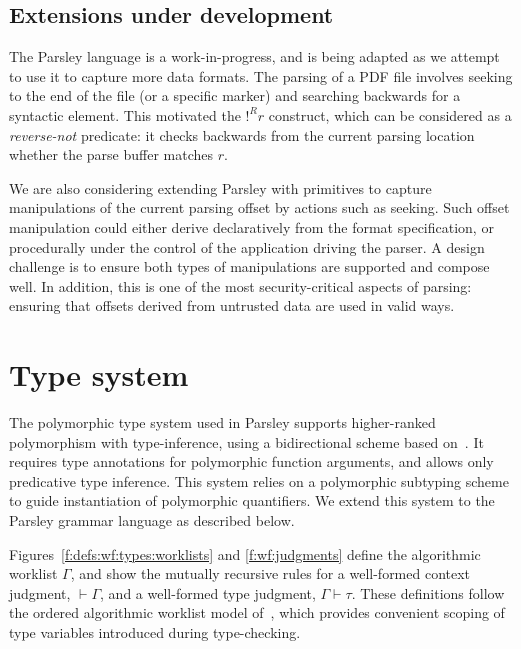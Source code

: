 \documentclass[letterpaper]{article}
\begin{document}
\subsection*{Extensions under development}

The Parsley language is a work-in-progress, and is being adapted as we
attempt to use it to capture more data formats.  The parsing of a PDF
file involves seeking to the end of the file (or a specific marker)
and searching backwards for a syntactic element.  This motivated the
$!^Rr$ construct, which can be considered as a \emph{reverse-not}
predicate: it checks backwards from the current parsing location
whether the parse buffer matches $r$.

We are also considering extending Parsley with primitives to capture
manipulations of the current parsing offset by actions such as
seeking.  Such offset manipulation could either derive declaratively
from the format specification, or procedurally under the control of
the application driving the parser.  A design challenge is to ensure
both types of manipulations are supported and compose well.  In
addition, this is one of the most security-critical aspects of
parsing: ensuring that offsets derived from untrusted data are used in
valid ways.

\section{Type system}
\label{s:typesys}

The polymorphic type system used in Parsley supports higher-ranked
polymorphism with type-inference, using a bidirectional scheme based
on~\cite{Dunfield13:bidir}.  It requires type annotations for
polymorphic function arguments, and allows only predicative type
inference.  This system relies on a polymorphic subtyping scheme
\cite{odersky96} to guide instantiation of polymorphic quantifiers.
We extend this system to the Parsley grammar language as described
below.

Figures~\ref{f:defs:wf:types:worklists} and \ref{f:wf:judgments} define the algorithmic
worklist $\Gamma$, and show the mutually recursive rules for a
well-formed context judgment, $\vdash\Gamma$, and a well-formed type
judgment, $\Gamma\vdash\tau$.  These definitions follow the ordered
algorithmic worklist model of~\cite{zhao2018,zhao19:bidir}, which
provides convenient scoping of type variables introduced during
type-checking.
\end{document}
